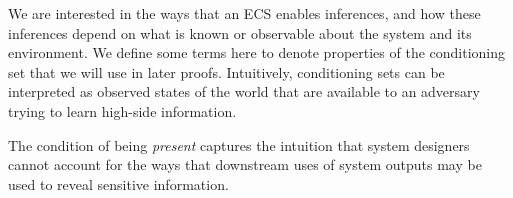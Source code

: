 \documentclass[../thesis.tex]{subfiles}
\begin{document}
%
%
%
%
%
%

%

We are interested in the ways that an ECS
enables inferences, and how these inferences
depend on what is known or observable about
the system and its environment.
We define some terms here to denote properties
of the conditioning set that we will use in
later proofs.
Intuitively, conditioning sets can be interpreted
as observed states of the world that are available
to an adversary trying to learn high-side information.

The condition of being \emph{present} captures the
intuition that system designers cannot account for
the ways that downstream uses of system outputs
may be used to reveal sensitive information.
\end{document}

